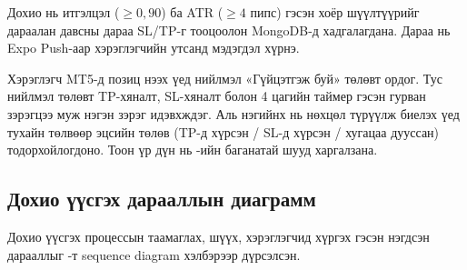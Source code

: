 \noindent Дохио нь итгэлцэл ($\geq 0{,}90$) ба ATR ($\geq 4$ пипс) гэсэн хоёр шүүлтүүрийг дараалан давсны дараа SL/TP-г тооцоолон MongoDB-д хадгалагдана. Дараа нь Expo Push-аар хэрэглэгчийн утсанд мэдэгдэл хүрнэ.

Хэрэглэгч MT5-д позиц нээх үед нийлмэл «Гүйцэтгэж буй» төлөвт ордог. Тус нийлмэл төлөвт TP-хяналт, SL-хяналт болон 4 цагийн таймер гэсэн гурван зэрэгцээ муж нэгэн зэрэг идэвхждэг. Аль нэгийнх нь нөхцөл түрүүлж биелэх үед тухайн төлвөөр эцсийн төлөв (TP-д хүрсэн / SL-д хүрсэн / хугацаа дууссан) тодорхойлогдоно. Тоон үр дүн нь -ийн баганатай шууд харгалзана.

\subsection{Дохио үүсгэх дарааллын диаграмм}

Дохио үүсгэх процессын таамаглах, шүүх, хэрэглэгчид хүргэх гэсэн нэгдсэн дарааллыг -т sequence diagram хэлбэрээр дүрсэлсэн.


